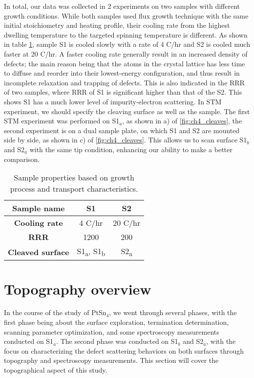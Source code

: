 \par In total, our data was collected in 2 experiments on two samples with different growth conditions. While both samples used flux growth technique with the same initial stoichiometry and heating profile, their cooling rate from the highest dwelling temperature to the targeted spinning temperature is different. As shown in table \ref{table:sample}, sample S1 is cooled slowly with a rate of 4 \degree C/hr and S2 is cooled much faster at 20 \degree C/hr. A faster cooling rate generally result in an increased density of defects; the main reason being that the atoms in the crystal lattice has less time to diffuse and reorder into their lowest-energy configuration, and thus result in incomplete relaxation and trapping of defects. This is also indicated in the \ac{RRR} of two samples, where \ac{RRR} of S1 is significant higher than that of the S2. This shows S1 has a much lower level of impurity-electron scattering.
In \ac{STM} experiment, we should specify the cleaving surface as well as the sample. The first \ac{STM} experiment was performed on S1$_a$, as shown in a) of \ref{fig:ch4_cleaves}, the second experiment is on a dual sample plate, on which S1 and S2 are mounted side by side, as shown in c) of \ref{fig:ch4_cleaves}. This allows us to scan surface S1$_b$ and S2$_a$ with the same tip condition, enhancing our ability to make a better comparison.

\begin{table}[h!]
	\centering
	\begin{tabular}{|c|c|c|}
		\hline
		\textbf{Sample name} & \textbf{S1} & \textbf{S2} \\ \hline
		\textbf{Cooling rate} & 4 \degree C/hr & 20 \degree C/hr \\ \hline
		\textbf{\ac{RRR}} & 1200 & 200 \\ \hline
		\textbf{Cleaved surface} & S1\textsubscript{a}, S1\textsubscript{b} & S2\textsubscript{a} \\ \hline
	\end{tabular}
	\caption{Sample properties based on growth process and transport characteristics.}
	\label{table:sample}
\end{table}

\section{Topography overview}
\par In the course of the study of PtSn$_4$, we went through several phases, with the first phase being about the surface exploration, termination determination, scanning parameter optimization, and some spectroscopy measurements conducted on S1$_a$. The second phase was conducted on S1$_b$ and S2$_a$, with the focus on characterizing the defect scattering behaviors on both surfaces through topography and spectroscopy measurements. This section will cover the topographical aspect of this study. 

